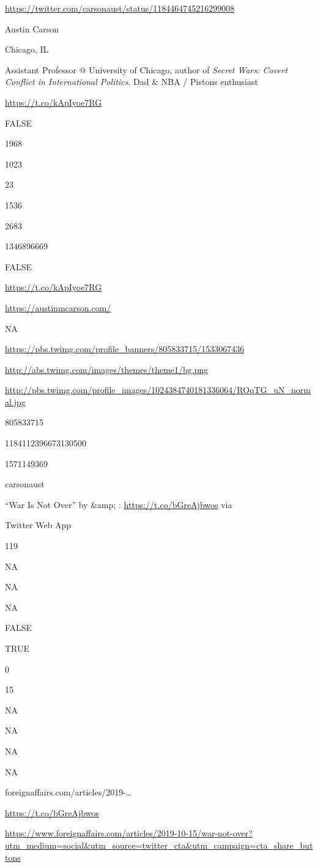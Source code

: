 \documentclass[]{book}
\begin{document}
\url{https://twitter.com/carsonaust/status/1184464745216299008}

Austin Carson

Chicago, IL

Assistant Professor @ University of Chicago, author of \emph{Secret
Wars: Covert Conflict in International Politics}. Dad \& NBA / Pistons
enthusiast

\url{https://t.co/kApIyoe7RG}

FALSE

1968

1023

23

1536

2683

1346896669

FALSE

\url{https://t.co/kApIyoe7RG}

\url{https://austinmcarson.com/}

NA

\url{https://pbs.twimg.com/profile_banners/805833715/1533067436}

\url{http://abs.twimg.com/images/themes/theme1/bg.png}

\url{http://pbs.twimg.com/profile_images/1024384740181336064/ROqTG_uN_normal.jpg}

805833715

1184112396673130500

1571149369

carsonaust

``War Is Not Over'' by \citet{tanishafazal} \&amp;
\citet{ProfPaulPoast}: \url{https://t.co/bGreAjbwos} via
\citet{ForeignAffairs}

Twitter Web App

119

NA

NA

NA

FALSE

TRUE

0

15

NA

NA

NA

NA

foreignaffairs.com/articles/2019-\ldots{}

\url{https://t.co/bGreAjbwos}

\url{https://www.foreignaffairs.com/articles/2019-10-15/war-not-over?utm_medium=social\&utm_source=twitter_cta\&utm_campaign=cta_share_buttons}
\end{document}
